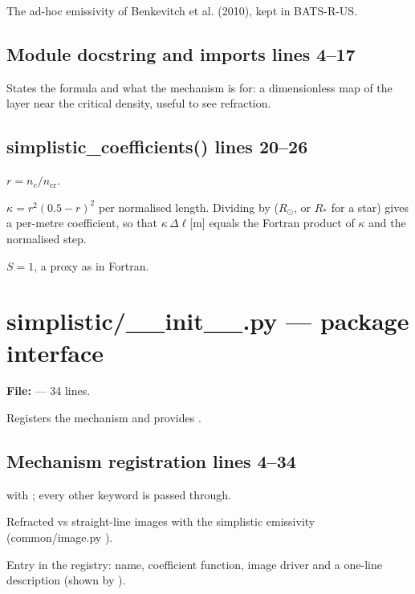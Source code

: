 The ad-hoc emissivity of Benkevitch et al. (2010), kept in BATS-R-US.

\section*{\normalsize Module docstring and imports \hfill{\small\mdseries\color{gray}lines 4--17}}

States the formula and what the mechanism is for: a dimensionless map of the layer near the critical density, useful to see refraction.

\section*{\normalsize simplistic\_coefficients() \hfill{\small\mdseries\color{gray}lines 20--26}}

\begin{lines}
\item[L.23] $r=n_e/n_\text{cr}$.
\item[L.25] $\kappa=r^2(0.5-r)^2$ per normalised length. Dividing by  ($R_\odot$, or $R_\ast$ for a star) gives a per-metre coefficient, so that $\kappa\,\Delta\ell$[m] equals the Fortran product of $\kappa$ and the normalised step.
\item[L.26] $S=1$, a proxy as in Fortran.
\end{lines}

\chapter{simplistic/\_\_init\_\_.py --- package interface}
\label{mod:simplistic:init.py}
\textbf{File:}  --- 34 lines.

Registers the mechanism and provides .

\section*{\normalsize Mechanism registration \hfill{\small\mdseries\color{gray}lines 4--34}}

\begin{lines}
\item[L.14]  with ; every other keyword is passed through.
\item[L.22] Refracted vs straight-line images with the simplistic emissivity (common/image.py ).
\item[L.29] Entry in the registry: name, coefficient function, image driver and a one-line description (shown by ).
\end{lines}

